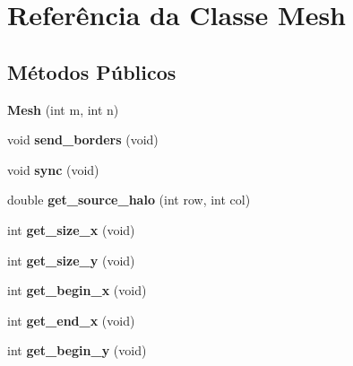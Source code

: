 \hypertarget{classMesh}{
\section{Referência da Classe Mesh}
\label{classMesh}
}
\subsection*{Métodos Públicos}
\begin{DoxyCompactItemize}
\item 
\hypertarget{classMesh_ab0757d7fa254a84b938b8ba040437e17}{
{\bfseries Mesh} (int m, int n)}
\label{classMesh_ab0757d7fa254a84b938b8ba040437e17}

\item 
\hypertarget{classMesh_ace385c416c632671b4047a6da4c4dd65}{
void {\bfseries send\_\-borders} (void)}
\label{classMesh_ace385c416c632671b4047a6da4c4dd65}

\item 
\hypertarget{classMesh_a15fa4609191e127f8755247b1186c60e}{
void {\bfseries sync} (void)}
\label{classMesh_a15fa4609191e127f8755247b1186c60e}

\item 
\hypertarget{classMesh_a98af13b9b3d5bd92ec31d517ea36f6e7}{
double {\bfseries get\_\-source\_\-halo} (int row, int col)}
\label{classMesh_a98af13b9b3d5bd92ec31d517ea36f6e7}

\item 
\hypertarget{classMesh_a4eda6b7cb85df683b83f22baa56299ca}{
int {\bfseries get\_\-size\_\-x} (void)}
\label{classMesh_a4eda6b7cb85df683b83f22baa56299ca}

\item 
\hypertarget{classMesh_a4edea44fcb67bbc27227e6a4457bac74}{
int {\bfseries get\_\-size\_\-y} (void)}
\label{classMesh_a4edea44fcb67bbc27227e6a4457bac74}

\item 
\hypertarget{classMesh_a7e2f3097e2de482e2e5bc1cea8429383}{
int {\bfseries get\_\-begin\_\-x} (void)}
\label{classMesh_a7e2f3097e2de482e2e5bc1cea8429383}

\item 
\hypertarget{classMesh_a6e673955960b861d4d7f16604d0cf82b}{
int {\bfseries get\_\-end\_\-x} (void)}
\label{classMesh_a6e673955960b861d4d7f16604d0cf82b}

\item 
\hypertarget{classMesh_a7bd15711230fef0f26ca55e305787fd8}{
int {\bfseries get\_\-begin\_\-y} (void)}
\label{classMesh_a7bd15711230fef0f26ca55e305787fd8}


\end{DoxyCompactItemize}
